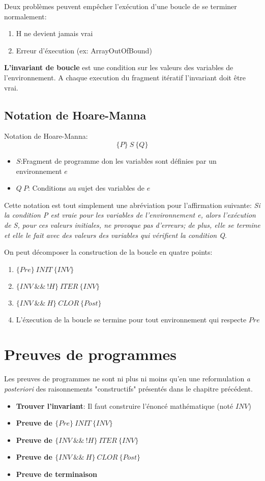 \documentclass[11pt, a4paper]{article}
\begin{document}
Deux problèmes peuvent empêcher l'exécution d'une boucle de se terminer normalement:
\begin{enumerate}
	\item \textsc{H} ne devient jamais vrai
	\item Erreur d'éxecution (ex: ArrayOutOfBound)
\end{enumerate}
\textbf{L'invariant de boucle} est une condition sur les valeurs des variables de l'environnement. A chaque execution du fragment itératif l'invariant doit être vrai.

\subsection{Notation de Hoare-Manna}

Notation de Hoare-Manna:
$$\{P\}\ S\ \{Q\}$$
\begin{itemize}
	\item $S$:Fragment de programme don les variables sont définies par un environnement $e$
	\item $Q\ P$: Conditions au sujet des variables de $e$
\end{itemize}
Cette notation est tout simplement une abréviation pour l'affirmation suivante: \textit{Si la condition P est vraie pour les variables de l'environnement e, alors l'exécution de S, pour ces valeurs initiales, ne provoque pas d'erreurs; de plus, elle se termine et elle le fait avec des valeurs des variables qui vérifient la condition Q}.

On peut décomposer la construction de la boucle en quatre points:
\begin{enumerate}
	\item $\{Pre\}\ INIT\ \{INV\}$
	\item $\{INV\ \&\&\ !H\}\ ITER\ \{INV\}$
	\item $\{INV\ \&\&\ H\}\ CLOR\ \{Post\}$
	\item L'éxecution de la boucle se termine pour tout environnement qui respecte $Pre$
\end{enumerate}

\section{Preuves de programmes}

Les preuves de programmes ne sont ni plus ni moins qu'en une reformulation \textit{a posteriori} des raisonnements "constructifs" présentés dans le chapitre précédent.

\begin{itemize}
\item \textbf{Trouver l'invariant}: Il faut construire l'énoncé mathématique (noté $INV$) 
\item \textbf{Preuve de $\{Pre\}\ INIT\ \{INV\}$}
\item \textbf{Preuve de $\{INV\ \&\&\ !H\}\ ITER\ \{INV\}$}
\item \textbf{Preuve de $\{INV\ \&\&\ H\}\ CLOR\ \{Post\}$}
\item \textbf{Preuve de terminaison}

\end{itemize}
\end{document}
